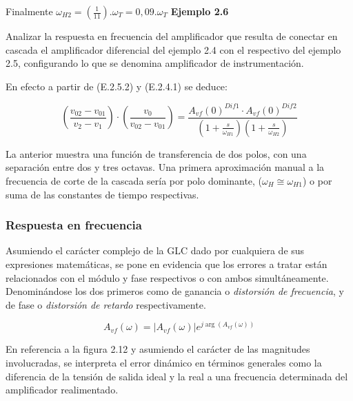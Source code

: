\vspace{0.5cm}

\noindent Finalmente \quad $\omega_{H2} = \left( \frac{1}{11} \right) . \omega_T = 0,09 . \omega_T$
\noindent \textbf{\large Ejemplo 2.6}

\vspace{0.2cm}

\noindent Analizar la respuesta en frecuencia del amplificador que resulta de conectar en cascada el amplificador diferencial del ejemplo 2.4 con el respectivo del ejemplo 2.5, configurando lo que se denomina amplificador de instrumentación.

\vspace{0.4cm}

\noindent En efecto a partir de (E.2.5.2) y (E.2.4.1) se deduce:

\begin{equation*}
\left( \frac{v_{02} - v_{01}}{v_2 - v_1} \right) \cdot \left( \frac{v_0}{v_{02} - v_{01}} \right) = \frac{A_{vf}(0)^{Dif1} \cdot A_{vf}(0)^{Dif2}}{ \left( 1 + \frac{s}{\omega_{H1}} \right) \left( 1 + \frac{s}{\omega_{H2}} \right) }
\end{equation*}

\vspace{0.4cm}

\noindent La anterior muestra una función de transferencia de dos polos, con una separación entre dos y tres octavas. Una primera aproximación manual a la frecuencia de corte de la cascada sería por polo dominante, ($\omega_H \cong \omega_{H1}$) o por suma de las constantes de tiempo respectivas.
\subsubsection{Respuesta en frecuencia}
\noindent Asumiendo el carácter complejo de la GLC dado por cualquiera de sus expresiones matemáticas, se pone en evidencia que los errores a tratar están relacionados con el módulo y fase respectivos o con ambos simultáneamente. Denominándose los dos primeros como de ganancia o \textit{distorsión de frecuencia}, y de fase o \textit{distorsión de retardo} respectivamente.

\begin{equation} \tag{2.35}
A_{vf}(\omega) = \big| A_{vf}(\omega) \big| e^{j \arg(A_{vf}(\omega))}
\end{equation}

\noindent En referencia a la figura 2.12 y asumiendo el carácter de las magnitudes involucradas, se interpreta el error dinámico en términos generales como la diferencia de la tensión de salida ideal y la real a una frecuencia determinada del amplificador realimentado.

